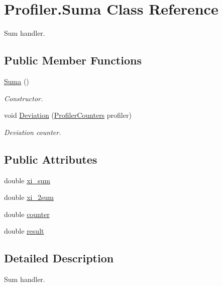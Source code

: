 \hypertarget{classProfiler_1_1Suma}{}\section{Profiler.\+Suma Class Reference}
\label{classProfiler_1_1Suma}


Sum handler.  


\subsection*{Public Member Functions}
\begin{DoxyCompactItemize}
\item 
\hyperlink{classProfiler_1_1Suma_a7ac4ae65701886743c0e13e25eedb21c}{Suma} ()
\begin{DoxyCompactList}\small\item\em Constructor. \end{DoxyCompactList}\item 
void \hyperlink{classProfiler_1_1Suma_ac706fdbb956efae8fca51cb6bdb08bfd}{Deviation} (\hyperlink{classProfiler_1_1ProfilerCounters}{Profiler\+Counters} profiler)
\begin{DoxyCompactList}\small\item\em Deviation counter. \end{DoxyCompactList}\end{DoxyCompactItemize}
\subsection*{Public Attributes}
\begin{DoxyCompactItemize}
\item 
double \hyperlink{classProfiler_1_1Suma_a517cdab6733ffb45242cad4f7cd1af1c}{xi\+\_\+sum}
\item 
double \hyperlink{classProfiler_1_1Suma_ad555897c23ee47308cd9faebabd758ce}{xi\+\_\+2sum}
\item 
double \hyperlink{classProfiler_1_1Suma_a2cbdd09825bd90617b5f21962d8ff425}{counter}
\item 
double \hyperlink{classProfiler_1_1Suma_ae61cfef0fddb2f2e980120acefcbd522}{result}
\end{DoxyCompactItemize}


\subsection{Detailed Description}
Sum handler. 

